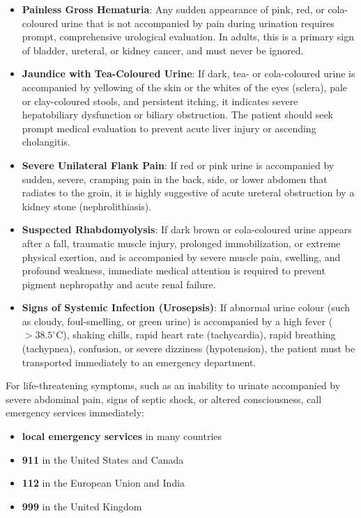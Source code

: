 \begin{itemize}
  \item \textbf{Painless Gross Hematuria}: Any sudden appearance of pink, red, or cola-coloured urine that is not accompanied by pain during urination requires prompt, comprehensive urological evaluation. In adults, this is a primary sign of bladder, ureteral, or kidney cancer, and must never be ignored.
  \item \textbf{Jaundice with Tea-Coloured Urine}: If dark, tea- or cola-coloured urine is accompanied by yellowing of the skin or the whites of the eyes (sclera), pale or clay-coloured stools, and persistent itching, it indicates severe hepatobiliary dysfunction or biliary obstruction. The patient should seek prompt medical evaluation to prevent acute liver injury or ascending cholangitis.
  \item \textbf{Severe Unilateral Flank Pain}: If red or pink urine is accompanied by sudden, severe, cramping pain in the back, side, or lower abdomen that radiates to the groin, it is highly suggestive of acute ureteral obstruction by a kidney stone (nephrolithiasis).
  \item \textbf{Suspected Rhabdomyolysis}: If dark brown or cola-coloured urine appears after a fall, traumatic muscle injury, prolonged immobilization, or extreme physical exertion, and is accompanied by severe muscle pain, swelling, and profound weakness, immediate medical attention is required to prevent pigment nephropathy and acute renal failure.
  \item \textbf{Signs of Systemic Infection (Urosepsis)}: If abnormal urine colour (such as cloudy, foul-smelling, or green urine) is accompanied by a high fever ($>38.5^\circ$C), shaking chills, rapid heart rate (tachycardia), rapid breathing (tachypnea), confusion, or severe dizziness (hypotension), the patient must be transported immediately to an emergency department.
\end{itemize}

For life-threatening symptoms, such as an inability to urinate accompanied by severe abdominal pain, signs of septic shock, or altered consciousness, call emergency services immediately:
\begin{itemize}
  \item \textbf{local emergency services} in many countries
  \item \textbf{911} in the United States and Canada
  \item \textbf{112} in the European Union and India
  \item \textbf{999} in the United Kingdom
\end{itemize}

